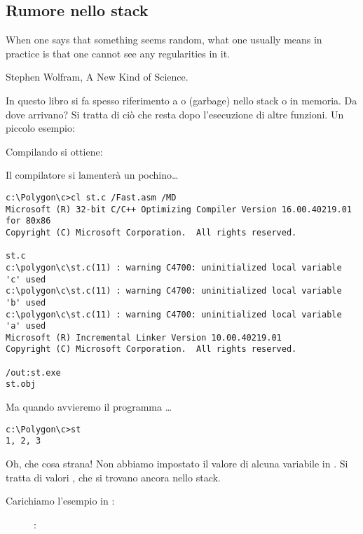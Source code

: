 \subsection{Rumore nello stack}
\label{noise_in_stack}

\epigraph{When one says that something seems random, what one usually
means in practice is that one cannot see any regularities in it.}{Stephen Wolfram, A New Kind of Science.}

In questo libro si fa spesso riferimento a  o  (garbage) nello stack o in memoria.
Da dove arrivano?
Si tratta di ciò che resta dopo l'esecuzione di altre funzioni.
Un piccolo esempio:



Compilando si ottiene:



Il compilatore si lamenterà un pochino\dots

\begin{lstlisting}
c:\Polygon\c>cl st.c /Fast.asm /MD
Microsoft (R) 32-bit C/C++ Optimizing Compiler Version 16.00.40219.01 for 80x86
Copyright (C) Microsoft Corporation.  All rights reserved.

st.c
c:\polygon\c\st.c(11) : warning C4700: uninitialized local variable 'c' used
c:\polygon\c\st.c(11) : warning C4700: uninitialized local variable 'b' used
c:\polygon\c\st.c(11) : warning C4700: uninitialized local variable 'a' used
Microsoft (R) Incremental Linker Version 10.00.40219.01
Copyright (C) Microsoft Corporation.  All rights reserved.

/out:st.exe
st.obj
\end{lstlisting}

Ma quando avvieremo il programma \dots

\begin{lstlisting}
c:\Polygon\c>st
1, 2, 3
\end{lstlisting}

Oh, che cosa strana! Non abbiamo impostato il valore di alcuna variabile in .
Si tratta di valori , che si trovano ancora nello stack.

\clearpage
Carichiamo l'esempio in \olly:

\begin{figure}[H]
\centering
{}
\caption{\olly: }
\label{fig:stack_noise_olly1}
\end{figure}

